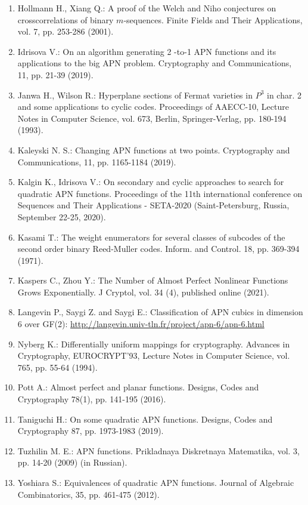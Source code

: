 \documentclass[10pt]{article}
\begin{document}
\begin{enumerate}
  \item Hollmann H., Xiang Q.: A proof of the Welch and Niho conjectures on crosscorrelations of binary $m$-sequences. Finite Fields and Their Applications, vol. 7, pp. 253-286 (2001).
  \item Idrisova V.: On an algorithm generating 2 -to-1 APN functions and its applications to the big APN problem. Cryptography and Communications, 11, pp. 21-39 (2019).
  \item Janwa H., Wilson R.: Hyperplane sections of Fermat varieties in $P^{3}$ in char. 2 and some applications to cyclic codes. Proceedings of AAECC-10, Lecture Notes in Computer Science, vol. 673, Berlin, Springer-Verlag, pp. 180-194 (1993).
  \item Kaleyski N. S.: Changing APN functions at two points. Cryptography and Communications, 11, pp. 1165-1184 (2019).
  \item Kalgin K., Idrisova V.: On secondary and cyclic approaches to search for quadratic APN functions. Proceedings of the 11th international conference on Sequences and Their Applications - SETA-2020 (Saint-Petersburg, Russia, September 22-25, 2020).
  \item Kasami T.: The weight enumerators for several classes of subcodes of the second order binary Reed-Muller codes. Inform. and Control. 18, pp. 369-394 (1971).
  \item Kaspers C., Zhou Y.: The Number of Almost Perfect Nonlinear Functions Grows Exponentially. J Cryptol, vol. 34 (4), published online (2021).
  \item Langevin P., Saygi Z. and Saygi E.: Classification of APN cubics in dimension 6 over GF(2): \href{http://langevin.univ-tln.fr/project/apn-6/apn-6.html}{http://langevin.univ-tln.fr/project/apn-6/apn-6.html}
  \item Nyberg K.: Differentially uniform mappings for cryptography. Advances in Cryptography, EUROCRYPT'93, Lecture Notes in Computer Science, vol. 765, pp. 55-64 (1994).
  \item Pott A.: Almost perfect and planar functions. Designs, Codes and Cryptography 78(1), pp. 141-195 (2016).
  \item Taniguchi H.: On some quadratic APN functions. Designs, Codes and Cryptography 87, pp. 1973-1983 (2019).
  \item Tuzhilin M. E.: APN functions. Prikladnaya Diskretnaya Matematika, vol. 3, pp. 14-20 (2009) (in Russian).
  \item Yoshiara S.: Equivalences of quadratic APN functions. Journal of Algebraic Combinatorics, 35, pp. 461-475 (2012).

\end{enumerate}
\end{document}
